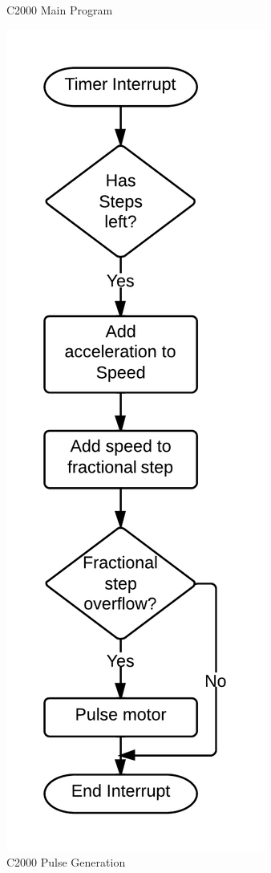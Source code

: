 \begin{figure}[!ht]
\begin{minipage}{.45\textwidth}
		\caption{C2000 Main Program}
		\label{fig:c2000-main}
	\end{minipage}
	\begin{minipage}{.45\textwidth}
		\centering
		\includegraphics[width=.75\textwidth]{software-design/c2000-pulse.png}
		\caption{C2000 Pulse Generation}
		\label{fig:c2000-pulse}
	\end{minipage}
\end{figure}